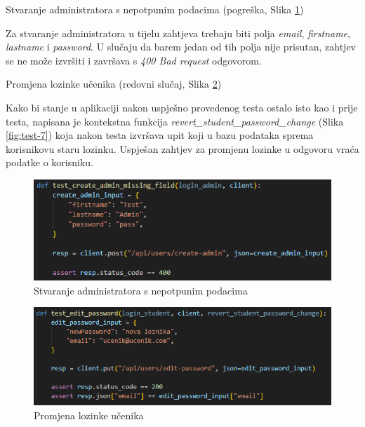 \begin{packed_item}

    \item Stvaranje administratora s nepotpunim podacima (pogreška, Slika \ref{fig:test-5})
    \item[]  \begin{packed_item}

        \item Za stvaranje administratora u tijelu zahtjeva trebaju biti polja \emph{email}, \emph{firstname}, \emph{lastname} i \emph{password}. U slučaju da barem jedan od tih polja nije prisutan, zahtjev se ne može izvršiti i završava s \emph{400 Bad request} odgovorom.
        
    \end{packed_item}

    \item Promjena lozinke učenika (redovni slučaj, Slika \ref{fig:test-6})
    \item[]  \begin{packed_item}

        \item Kako bi stanje u aplikaciji nakon uspješno provedenog testa ostalo isto kao i prije testa, napisana je kontekstna funkcija \emph{revert\_student\_password\_change} (Slika \ref{fig:test-7}) koja nakon testa izvršava upit koji u bazu podataka sprema korisnikovu staru lozinku. Uspješan zahtjev za promjenu lozinke u odgovoru vraća podatke o korisniku. 
        
    \end{packed_item}
    
\end{packed_item}

\begin{figure}[htp]
	\includegraphics[scale=1]{slike/test_admin.png}
	\centering
	\caption{Stvaranje administratora s nepotpunim podacima}
	\label{fig:test-5}
\end{figure}

\begin{figure}[htp]
	\includegraphics[scale=0.9]{slike/test_pwd.png}
	\centering
	\caption{Promjena lozinke učenika}
	\label{fig:test-6}
\end{figure}

